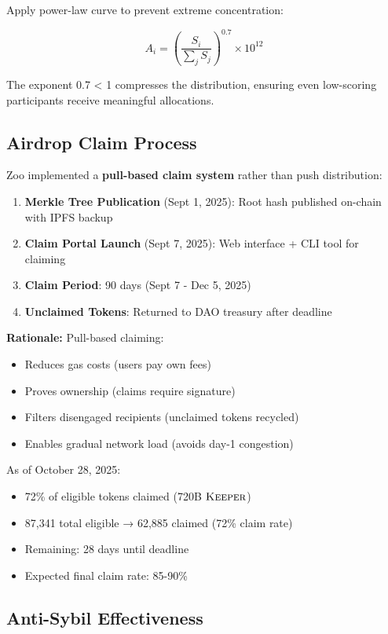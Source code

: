 \documentclass[11pt,letterpaper]{article}
\theoremstyle{definition}
\theoremstyle{remark}
\newcommand{\KEEPER}{\textsc{Keeper}}
\begin{document}
Apply power-law curve to prevent extreme concentration:

\begin{equation}
A_i = \left( \frac{S_i}{\sum_{j} S_j} \right)^{0.7} \times 10^{12}
\end{equation}

The exponent 0.7 < 1 compresses the distribution, ensuring even low-scoring participants receive meaningful allocations.

\subsection{Airdrop Claim Process}

Zoo implemented a \textbf{pull-based claim system} rather than push distribution:

\begin{enumerate}
\item \textbf{Merkle Tree Publication} (Sept 1, 2025): Root hash published on-chain with IPFS backup
\item \textbf{Claim Portal Launch} (Sept 7, 2025): Web interface + CLI tool for claiming
\item \textbf{Claim Period}: 90 days (Sept 7 - Dec 5, 2025)
\item \textbf{Unclaimed Tokens}: Returned to DAO treasury after deadline
\end{enumerate}

\textbf{Rationale:} Pull-based claiming:
\begin{itemize}
\item Reduces gas costs (users pay own fees)
\item Proves ownership (claims require signature)
\item Filters disengaged recipients (unclaimed tokens recycled)
\item Enables gradual network load (avoids day-1 congestion)
\end{itemize}

As of October 28, 2025:
\begin{itemize}
\item 72\% of eligible tokens claimed (720B $\KEEPER$)
\item 87,341 total eligible → 62,885 claimed (72\% claim rate)
\item Remaining: 28 days until deadline
\item Expected final claim rate: 85-90\%
\end{itemize}

\subsection{Anti-Sybil Effectiveness}
\end{document}
